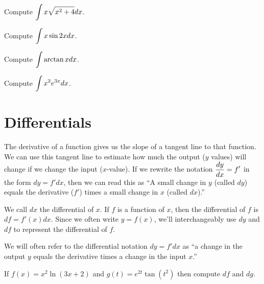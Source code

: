 \begin{problem}
Compute $\displaystyle\int x\sqrt{x^2+4}dx$.
\end{problem}

\begin{problem}
Compute $\displaystyle\int x\sin 2x dx$.
\end{problem}

\begin{problem}
Compute $\displaystyle \int \arctan x dx$.
\end{problem}

\begin{problem}
Compute $\displaystyle \int x^2 e^{3x} dx$.
\end{problem}


\newpage

\section{Differentials}
The derivative of a function gives us the slope of a tangent line to that function. We can use this tangent line to estimate how much the output ($y$ values) will change if we change the input ($x$-value). If we rewrite the notation $\displaystyle\frac{dy}{dx}=f'$ in the form $dy=f' dx$, then we can read this as ``A small change in $y$ (called $dy$) equals the derivative ($f'$) times a small change in $x$ (called $dx$).'' 

\begin{definition}
We call $dx$ the differential of $x$.  If $f$ is a function of $x$, then the differential of $f$ is $df = f'(x) dx$. Since we often write $y=f(x)$, we'll interchangeably use $dy$ and $df$ to represent the differential of $f$. 

We will often refer to the differential notation $dy=f'dx$ as ``a change in the output $y$ equals the derivative times a change in the input $x$.'' 
\end{definition}

\begin{problem}
If $f(x) = x^2\ln(3x+2)$ and $g(t) = e^{2t}\tan(t^2)$ then compute $df$ and $dg$.  
\end{problem}

